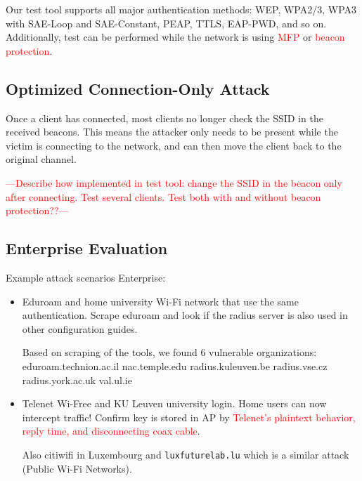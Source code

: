 \documentclass[sigconf,review,anonymous]{acmart}
\newcommand{\wifi}{\mbox{Wi-Fi}}
\DeclareRobustCommand{\red}[1]{\textcolor{red}{#1}}
\begin{document}
Our test tool supports all major authentication methods: WEP, WPA2/3, WPA3 with SAE-Loop and SAE-Constant, PEAP, TTLS, EAP-PWD, and so on.
Additionally, test can be performed while the network is using \red{MFP} or \red{beacon protection}.

\subsection{Optimized Connection-Only Attack}

Once a client has connected, most clients no longer check the SSID in the received beacons.
This means the attacker only needs to be present while the victim is connecting to the network, and can then move the client back to the original channel.

\red{---Describe how implemented in test tool: change the SSID in the beacon only after connecting. Test several clients. Test both with and without beacon protection??---}


\subsection{Enterprise Evaluation}
\label{sec:eval:ent}

Example attack scenarios Enterprise:
\begin{itemize}
	\item Eduroam and home university \wifi{} network that use the same authentication.
	Scrape eduroam and look if the radius server is also used in other configuration guides.

	Based on scraping of the tools, we found 6 vulnerable organizations:
	eduroam.technion.ac.il
	nac.temple.edu
	radius.kuleuven.be
	radius.vse.cz
	radius.york.ac.uk
	val.ul.ie


	\item Telenet Wi-Free and KU Leuven university login.
	Home users can now intercept traffic!
	Confirm key is stored in AP by \red{Telenet's plaintext behavior, reply time, and disconnecting coax cable}.
	
	Also citiwifi in Luxembourg and \verb|luxfuturelab.lu| which is a similar attack (Public \wifi{} Networks).
\end{itemize}
\end{document}
